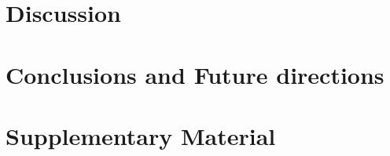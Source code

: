 \documentclass[11pt]{article}
\begin{document}


\section{Discussion}

%

\section{Conclusions and Future directions}

%

\newpage 



\newpage 
\section{Supplementary Material }

%
\end{document}
